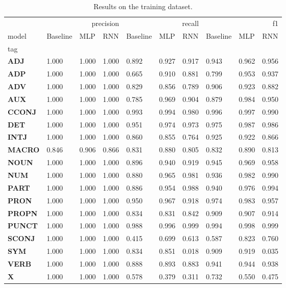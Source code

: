 \begin{table}
\caption{Results on the training dataset.}
\label{tab::ex_2_train}
\begin{tabular}{|l||l||l||l||l||l||l||l||l||l|}
\toprule
 & \multicolumn{3}{r}{precision} & \multicolumn{3}{r}{recall} & \multicolumn{3}{r}{f1} \\
model & Baseline & MLP & RNN & Baseline & MLP & RNN & Baseline & MLP & RNN \\
tag &  &  &  &  &  &  &  &  &  \\
\midrule
\textbf{ADJ} & 1.000 & 1.000 & 1.000 & 0.892 & 0.927 & 0.917 & 0.943 & 0.962 & 0.956 \\
\textbf{ADP} & 1.000 & 1.000 & 1.000 & 0.665 & 0.910 & 0.881 & 0.799 & 0.953 & 0.937 \\
\textbf{ADV} & 1.000 & 1.000 & 1.000 & 0.829 & 0.856 & 0.789 & 0.906 & 0.923 & 0.882 \\
\textbf{AUX} & 1.000 & 1.000 & 1.000 & 0.785 & 0.969 & 0.904 & 0.879 & 0.984 & 0.950 \\
\textbf{CCONJ} & 1.000 & 1.000 & 1.000 & 0.993 & 0.994 & 0.980 & 0.996 & 0.997 & 0.990 \\
\textbf{DET} & 1.000 & 1.000 & 1.000 & 0.951 & 0.974 & 0.973 & 0.975 & 0.987 & 0.986 \\
\textbf{INTJ} & 1.000 & 1.000 & 1.000 & 0.860 & 0.855 & 0.764 & 0.925 & 0.922 & 0.866 \\
\textbf{MACRO} & 0.846 & 0.906 & 0.866 & 0.831 & 0.880 & 0.805 & 0.832 & 0.890 & 0.813 \\
\textbf{NOUN} & 1.000 & 1.000 & 1.000 & 0.896 & 0.940 & 0.919 & 0.945 & 0.969 & 0.958 \\
\textbf{NUM} & 1.000 & 1.000 & 1.000 & 0.880 & 0.965 & 0.981 & 0.936 & 0.982 & 0.990 \\
\textbf{PART} & 1.000 & 1.000 & 1.000 & 0.886 & 0.954 & 0.988 & 0.940 & 0.976 & 0.994 \\
\textbf{PRON} & 1.000 & 1.000 & 1.000 & 0.950 & 0.967 & 0.918 & 0.974 & 0.983 & 0.957 \\
\textbf{PROPN} & 1.000 & 1.000 & 1.000 & 0.834 & 0.831 & 0.842 & 0.909 & 0.907 & 0.914 \\
\textbf{PUNCT} & 1.000 & 1.000 & 1.000 & 0.988 & 0.996 & 0.999 & 0.994 & 0.998 & 0.999 \\
\textbf{SCONJ} & 1.000 & 1.000 & 1.000 & 0.415 & 0.699 & 0.613 & 0.587 & 0.823 & 0.760 \\
\textbf{SYM} & 1.000 & 1.000 & 1.000 & 0.834 & 0.851 & 0.018 & 0.909 & 0.919 & 0.035 \\
\textbf{VERB} & 1.000 & 1.000 & 1.000 & 0.888 & 0.893 & 0.883 & 0.941 & 0.944 & 0.938 \\
\textbf{X} & 1.000 & 1.000 & 1.000 & 0.578 & 0.379 & 0.311 & 0.732 & 0.550 & 0.475 \\
\bottomrule
\end{tabular}
\end{table}
